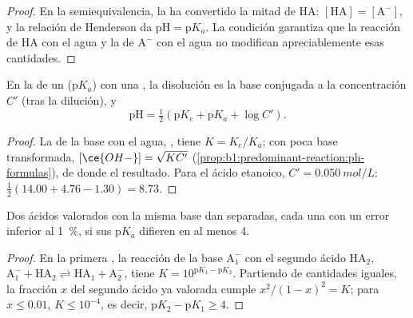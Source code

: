 \begin{proof}
En la semiequivalencia, la  
ha convertido la mitad de HA: $[\mathrm{HA}] = [\mathrm{A^-}]$, y la
relación de Henderson da $\mathrm{pH} = \mathrm{p}K_a$. La condición
garantiza que la reacción de HA con el agua y la de $\mathrm{A^-}$ con el
agua no modifican apreciablemente esas cantidades.
\end{proof}

\begin{proposition}\label{prop:b1:titration-methods:ph-at-equivalence}
En la  de un  ($\mathrm{p}K_a$) con una , la disolución es la base conjugada a la concentración $C'$ (tras
la dilución), y
\[
  \mathrm{pH} = \tfrac12(\mathrm{p}K_e + \mathrm{p}K_a + \log C') .
\]
\end{proposition}

\begin{proof}
La  de la base con el agua,
, tiene $K = K_e/K_a$; con poca base
transformada, $[\ce{OH-}] = \sqrt{KC'}$ (\cref{prop:b1:predominant-reaction:ph-formulas}),
de donde el resultado. Para el ácido etanoico, $C' = \qty{0.050}{mol/L}$:
$\frac12(14.00 + 4.76 - 1.30) = 8.73$.
\end{proof}

\begin{proposition}\label{prop:b1:titration-methods:successive}
Dos ácidos valorados con la misma base dan  separadas, cada
una con un error inferior al \qty{1}{\percent}, si sus $\mathrm{p}K_a$
difieren en al menos 4.
\end{proposition}

\begin{proof}
En la primera , la reacción de la base $\mathrm{A_1^-}$ con
el segundo ácido $\mathrm{HA_2}$, $\mathrm{A_1^-} + \mathrm{HA_2}
\rightleftharpoons \mathrm{HA_1} + \mathrm{A_2^-}$, tiene $K = 10^{\mathrm{p}K_1 - \mathrm{p}K_2}$.
Partiendo de cantidades iguales, la fracción $x$ del segundo ácido ya
valorada cumple $x^2/(1 - x)^2 = K$; para $x \leqslant 0.01$, $K
\leqslant 10^{-4}$, es decir, $\mathrm{p}K_2 - \mathrm{p}K_1 \geqslant 4$.
\end{proof}

